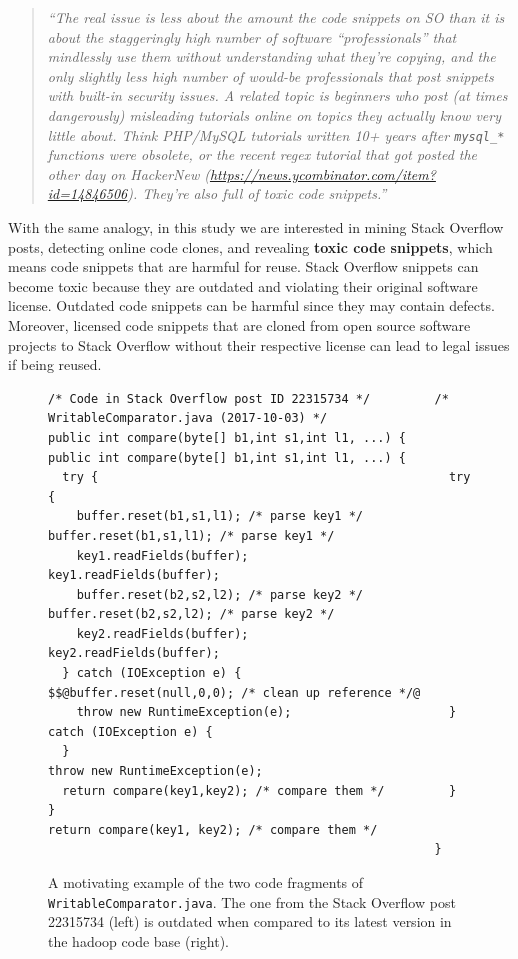 \documentclass[10pt,journal,compsoc]{IEEEtran}
\begin{document}
\begin{quote}\textit{``The real issue is less about the amount the code snippets
		on SO than it is about the staggeringly high number of software
		``professionals'' that mindlessly use them without understanding what they're
		copying, and the only slightly less high number of would-be professionals that
		post snippets with built-in security issues.  A related topic is beginners who
		post (at times dangerously) misleading tutorials online on topics they actually
		know very little about. Think PHP/MySQL tutorials written 10+ years after
		\texttt{mysql\_*} functions were obsolete, or the recent regex tutorial that
		got posted the other day on HackerNew
		(\url{https://news.ycombinator.com/item?id=14846506}). They're also full of
		toxic code snippets.''}\end{quote}

With the same analogy, in this study we are interested in mining Stack Overflow
posts, detecting online code clones, and revealing \textbf{toxic code snippets},
which means code snippets that are harmful for reuse.
Stack Overflow snippets can become toxic because they are outdated and violating
their original software license. Outdated code snippets can be harmful since
they may contain defects. Moreover, licensed code snippets that are cloned from
open source software projects to Stack Overflow without their respective license
can lead to legal issues if being reused.

\begin{figure}
	\begin{lstlisting}
/* Code in Stack Overflow post ID 22315734 */         /* WritableComparator.java (2017-10-03) */
public int compare(byte[] b1,int s1,int l1, ...) {    public int compare(byte[] b1,int s1,int l1, ...) {
  try {                                                 try {
    buffer.reset(b1,s1,l1); /* parse key1 */              buffer.reset(b1,s1,l1); /* parse key1 */
    key1.readFields(buffer);                              key1.readFields(buffer);
    buffer.reset(b2,s2,l2); /* parse key2 */              buffer.reset(b2,s2,l2); /* parse key2 */
    key2.readFields(buffer);                              key2.readFields(buffer);
  } catch (IOException e) {                               $$@buffer.reset(null,0,0); /* clean up reference */@
    throw new RuntimeException(e);                      } catch (IOException e) {
  }                                                       throw new RuntimeException(e);
  return compare(key1,key2); /* compare them */         }
}                                                       return compare(key1, key2); /* compare them */
                                                      }
	\end{lstlisting}\vspace{-2ex}
	\caption{A motivating example of the two code fragments of
		{\small\texttt{WritableComparator.java}}. The one from the
		Stack Overflow post 22315734 (left) is outdated when compared to
		its latest version in the \textsf{hadoop} code base
		(right).}
	\label{fig:before-after}
\end{figure}
\end{document}
